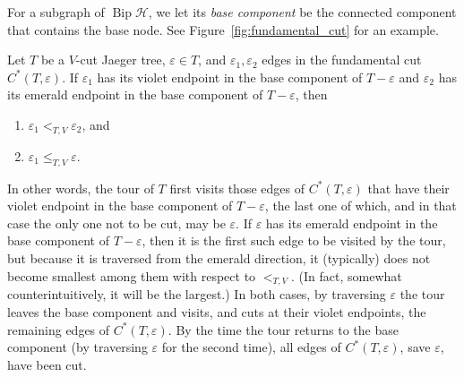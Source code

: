 \documentclass[ALCO,ThmDefs,Unicode,epreuves]{cedram}
\newcommand{\HH}{\mathcal H}
\DeclareMathOperator{\bip}{Bip}
\begin{document}
For a subgraph of $\bip\HH$, we let its \emph{base component} be the connected component that contains the base node. See Figure~\ref{fig:fundamental_cut} for an example.

\begin{lemma}\label{l:char_Jaeger_cuts}
	Let $T$ be a $V$-cut Jaeger tree, $\varepsilon \in T$,
	and $\varepsilon_1, \varepsilon_2$ edges in the fundamental cut $C^*(T,\varepsilon)$. If $\varepsilon_1$ has its violet endpoint in the base component of $T-\varepsilon$ and $\varepsilon_2$ has its emerald endpoint in the base component of $T-\varepsilon$, then 
\begin{enumerate}[label=(\roman*)]
	\item \label{egyegy} $\varepsilon_1 <_{T,V} \varepsilon_2$, and
	\item \label{kettoketto} $\varepsilon_1 \leq_{T,V} \varepsilon$.
\end{enumerate}
\end{lemma}

In other words, the tour of $T$ first visits those edges of $C^*(T,\varepsilon)$ that have their violet endpoint in the base component of $T-\varepsilon$, the last one of which, and in that case the only one not to be cut, may be $\varepsilon$. If $\varepsilon$ has its emerald endpoint in the base component of $T-\varepsilon$, then it is the first such edge to be visited by the tour, but because it is traversed from the emerald direction, it (typically) does not become smallest among them with respect to $<_{T,V}$. (In fact, somewhat counterintuitively, it will be the largest.) In both cases, by traversing $\varepsilon$ the tour leaves the base component and visits, and cuts at their violet endpoints, the remaining edges of $C^*(T,\varepsilon)$. By the time the tour returns to the base component (by traversing $\varepsilon$ for the second time), all edges of $C^*(T,\varepsilon)$, save $\varepsilon$, have been cut.
\end{document}
